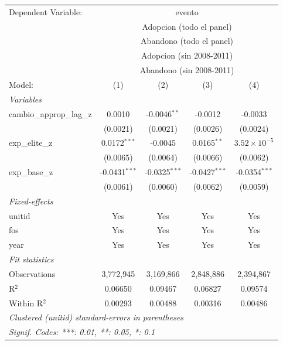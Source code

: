 
\begingroup
\centering
\begin{tabular}{lcccc}
   \tabularnewline \midrule \midrule
   Dependent Variable: & \multicolumn{4}{c}{evento}\\
    & \multicolumn{4}{c}{Adopcion (todo el panel)} \\ 
    & \multicolumn{4}{c}{Abandono (todo el panel)} \\ 
    & \multicolumn{4}{c}{Adopcion (sin 2008-2011)} \\ 
    & \multicolumn{4}{c}{Abandono (sin 2008-2011)} \\ 
   Model:                    & (1)             & (2)             & (3)             & (4)\\  
   \midrule
   \emph{Variables}\\
   cambio\_approp\_lag\_z    & 0.0010          & -0.0046$^{**}$  & -0.0012         & -0.0033\\   
                             & (0.0021)        & (0.0021)        & (0.0026)        & (0.0024)\\   
   exp\_elite\_z             & 0.0172$^{***}$  & -0.0045         & 0.0165$^{**}$   & $3.52\times 10^{-5}$\\    
                             & (0.0065)        & (0.0064)        & (0.0066)        & (0.0062)\\   
   exp\_base\_z              & -0.0431$^{***}$ & -0.0325$^{***}$ & -0.0427$^{***}$ & -0.0354$^{***}$\\   
                             & (0.0061)        & (0.0060)        & (0.0062)        & (0.0059)\\   
   \midrule
   \emph{Fixed-effects}\\
   unitid                    & Yes             & Yes             & Yes             & Yes\\  
   fos                       & Yes             & Yes             & Yes             & Yes\\  
   year                      & Yes             & Yes             & Yes             & Yes\\  
   \midrule
   \emph{Fit statistics}\\
   Observations              & 3,772,945       & 3,169,866       & 2,848,886       & 2,394,867\\  
   R$^2$                     & 0.06650         & 0.09467         & 0.06827         & 0.09574\\  
   Within R$^2$              & 0.00293         & 0.00488         & 0.00316         & 0.00486\\  
   \midrule \midrule
   \multicolumn{5}{l}{\emph{Clustered (unitid) standard-errors in parentheses}}\\
   \multicolumn{5}{l}{\emph{Signif. Codes: ***: 0.01, **: 0.05, *: 0.1}}\\
\end{tabular}
\par\endgroup


